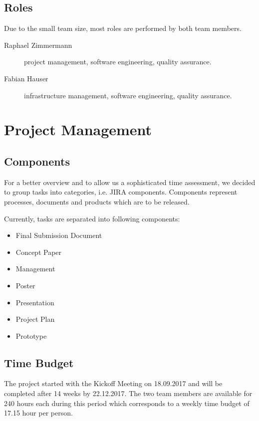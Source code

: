 \section{Roles}

Due to the small team size, most roles are performed by both team members.

\begin{description}
	\item[Raphael Zimmermann] project management, software engineering, quality assurance.
	\item[Fabian Hauser] infrastructure management, software engineering, quality assurance.
\end{description}

\chapter{Project Management}
\section{Components}

For a better overview and to allow us a sophisticated time assessment, we decided to group tasks into categories, i.e. JIRA components. Components represent processes, documents and products which are to be released.

Currently, tasks are separated into following components:

\begin{multicols}{2}
	\begin{itemize}
		\item Final Submission Document
		\item Concept Paper
		\item Management
		\item Poster
		\item Presentation
		\item Project Plan
		\item Prototype
	\end{itemize}
\end{multicols}

\section{Time Budget}

The project started with the Kickoff Meeting on 18.09.2017 and will be completed after 14 weeks by 22.12.2017.
The two team members are available for 240 hours each during this period which corresponds to a weekly time budget of 17.15 hour per person.

